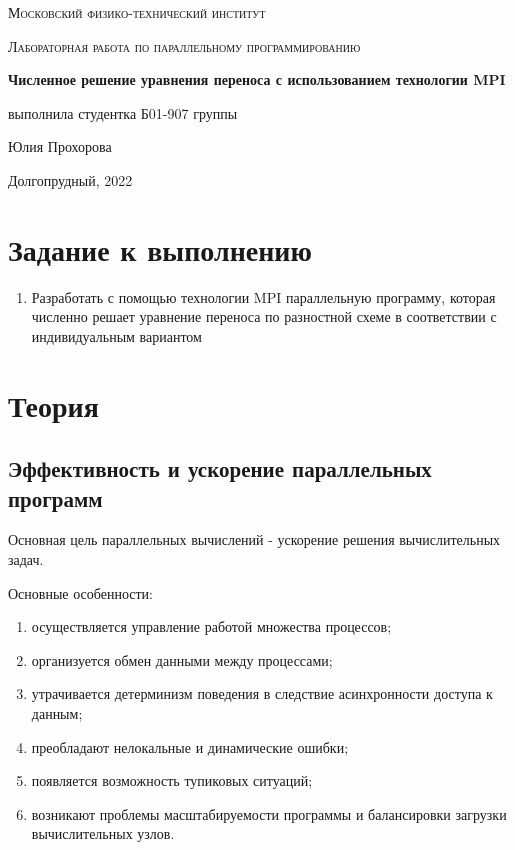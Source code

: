 \documentclass[a4paper]{article}
\begin{document}
\newcommand{\apple}{\char"F8FF}

\begin{titlepage}
	\centering
	\vspace{5cm}
    {\scshape\LARGE Московский физико-технический институт\par}


	\vspace{3cm}
	{\scshape\Large Лабораторная работа по параллельному программированию \par}
	\vspace{1cm}
	{\huge\bfseries  Численное решение уравнения переноса с использованием технологии MPI \par}
	\vspace{1cm}
	\vfill
\begin{flushright}
	{\large выполнила студентка Б01-907 группы}\par
	\vspace{0.3cm}
	{\LARGE Юлия Прохорова }
\end{flushright}
	
	\vfill
Долгопрудный, 2022
\end{titlepage}

\tableofcontents

\newpage

\section{Задание к выполнению}
\begin{enumerate}
    \item Разработать с помощью технологии MPI параллельную программу,
     которая численно решает уравнение переноса по разностной схеме в соответствии с индивидуальным вариантом
\end{enumerate}

\section{Теория}

\subsection{Эффективность и ускорение параллельных программ}

Основная цель параллельных вычислений - ускорение решения вычислительных задач. \par
Основные особенности:
\begin{enumerate}
    \item осуществляется управление работой множества процессов;
    \item организуется обмен данными между процессами;
    \item утрачивается детерминизм поведения в следствие асинхронности доступа к данным;
    \item преобладают нелокальные и динамические ошибки;
    \item появляется возможность тупиковых ситуаций;
    \item возникают проблемы масштабируемости программы и балансировки загрузки вычислительных узлов.
\end{enumerate}
\end{document}
